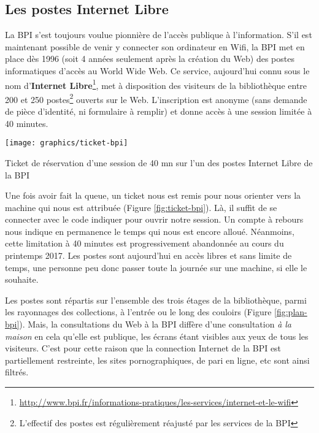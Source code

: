 \documentclass[symmetric,justified,marginals=raggedouter]{tufte-book}
\begin{document}
\subsection{Les postes Internet Libre}

\noindent La BPI s'est toujours voulue pionnière de l'accès publique à l'informa\-tion. S'il est maintenant possible de venir y connecter son ordinateur en Wifi, la BPI met en place dès 1996 (soit 4 années seulement après la création du Web) des postes informatiques d'accès au World Wide Web. Ce service, aujourd'hui connu sous le nom d'\textbf{Internet Libre}\footnote{\url{http://www.bpi.fr/informations-pratiques/les-services/internet-et-le-wifi}}, met à disposition des visiteurs de la bibliothèque entre 200 et 250 postes\footnote{L'effectif des postes est régulièrement réajusté par les services de la BPI} ouverts sur le Web. L'inscription est anonyme (sans demande de pièce d'identité, ni formulaire à remplir) et donne accès à une session limitée à 40 minutes.

\begin{marginfigure}%
  \texttt{[image: graphics/ticket-bpi]}
  \vspace*{0.2cm}  
  \caption{Ticket de réservation d'une session de 40 mn sur l'un des postes Internet Libre de la BPI}
  \label{fig:ticket-bpi}
\end{marginfigure} 

Une fois avoir fait la queue, un ticket nous est remis pour nous orienter vers la machine qui nous est attribuée (Figure \ref{fig:ticket-bpi}). Là, il suffit de se connecter avec le code indiquer pour ouvrir notre session. Un compte à rebours nous indique en permanence le temps qui nous est encore alloué. Néanmoins, cette limitation à 40 minutes est progressivement abandonnée au cours du printemps 2017. Les postes sont aujourd'hui en accès libres et sans limite de temps, une personne peu donc passer toute la journée sur une machine, si elle le souhaite. 

Les postes sont répartis sur l'ensemble des trois étages de la bibliothèque, parmi les rayonnages des collections, à l'entrée ou le long des couloirs (Figure \ref{fig:plan-bpi}). Mais, la consultations du Web à la BPI diffère d'une consultation \textit{à la maison} en cela qu'elle est publique, les écrans étant visibles aux yeux de tous les visiteurs. C'est pour cette raison que la connection Internet de la BPI est partiellement restreinte, les sites pornographiques, de pari en ligne, etc sont ainsi filtrés.
\end{document}
